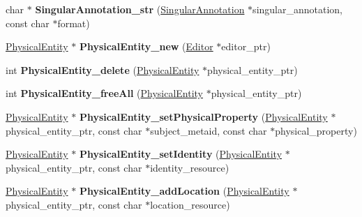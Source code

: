 \begin{DoxyCompactItemize}
\item 
\mbox{\label{namespaceomexmeta_ab75e894bdc1440c5e9af28156c1083be}} 
char $\ast$ {\bfseries Singular\+Annotation\+\_\+str} (\hyperlink{classomexmeta_1_1Triple}{Singular\+Annotation} $\ast$singular\+\_\+annotation, const char $\ast$format)
\item 
\mbox{\label{namespaceomexmeta_a3a7a18de6e1b6c264c3ee22cd289d243}} 
\hyperlink{classomexmeta_1_1PhysicalEntity}{Physical\+Entity} $\ast$ {\bfseries Physical\+Entity\+\_\+new} (\hyperlink{classomexmeta_1_1Editor}{Editor} $\ast$editor\+\_\+ptr)
\item 
\mbox{\label{namespaceomexmeta_a2468442b832806a57f5891c792c293d1}} 
int {\bfseries Physical\+Entity\+\_\+delete} (\hyperlink{classomexmeta_1_1PhysicalEntity}{Physical\+Entity} $\ast$physical\+\_\+entity\+\_\+ptr)
\item 
\mbox{\label{namespaceomexmeta_a1003038196d64626a43affdaae4f10c7}} 
int {\bfseries Physical\+Entity\+\_\+free\+All} (\hyperlink{classomexmeta_1_1PhysicalEntity}{Physical\+Entity} $\ast$physical\+\_\+entity\+\_\+ptr)
\item 
\mbox{\label{namespaceomexmeta_a37974ee43bc12c63dc5b1e7f451b6e9c}} 
\hyperlink{classomexmeta_1_1PhysicalEntity}{Physical\+Entity} $\ast$ {\bfseries Physical\+Entity\+\_\+set\+Physical\+Property} (\hyperlink{classomexmeta_1_1PhysicalEntity}{Physical\+Entity} $\ast$physical\+\_\+entity\+\_\+ptr, const char $\ast$subject\+\_\+metaid, const char $\ast$physical\+\_\+property)
\item 
\mbox{\label{namespaceomexmeta_ac44f68863532b3aa719a2cb9f0a1f73f}} 
\hyperlink{classomexmeta_1_1PhysicalEntity}{Physical\+Entity} $\ast$ {\bfseries Physical\+Entity\+\_\+set\+Identity} (\hyperlink{classomexmeta_1_1PhysicalEntity}{Physical\+Entity} $\ast$physical\+\_\+entity\+\_\+ptr, const char $\ast$identity\+\_\+resource)
\item 
\mbox{\label{namespaceomexmeta_abba48577926517d7d484b6b3b67fffb2}} 
\hyperlink{classomexmeta_1_1PhysicalEntity}{Physical\+Entity} $\ast$ {\bfseries Physical\+Entity\+\_\+add\+Location} (\hyperlink{classomexmeta_1_1PhysicalEntity}{Physical\+Entity} $\ast$physical\+\_\+entity\+\_\+ptr, const char $\ast$location\+\_\+resource)

\end{DoxyCompactItemize}
